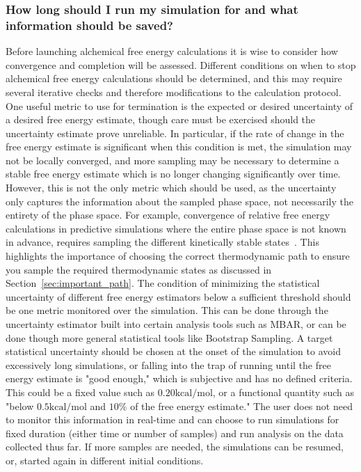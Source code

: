 \documentclass[9pt,bestpractices]{livecoms}
\begin{document}
\subsubsection{How long should I run my simulation for and what information should be saved?}
Before launching alchemical free energy calculations it is wise to consider how convergence and completion will be assessed. Different conditions on when to stop alchemical free energy calculations should be determined, and this may require several iterative checks and therefore modifications to the calculation protocol.
One useful metric to use for termination is the expected or desired uncertainty of a desired free energy estimate, though care must be exercised should the uncertainty estimate prove unreliable.
In particular, if the rate of change in the free energy estimate is significant when this condition is met, the simulation may not be locally converged, and more sampling may be necessary to determine a stable free energy estimate which is no longer changing significantly over time. 
However, this is not the only metric which should be used, as the uncertainty only captures the information about the sampled phase space, not necessarily the entirety of the phase space.  
For example, 
convergence of relative free energy calculations in predictive simulations where the entire phase space is not known in advance, requires sampling the different kinetically stable states~\cite{mobley2012perspective}.  
This highlights the importance of choosing the correct thermodynamic path to ensure you sample the required thermodynamic states as discussed in Section~\ref{sec:important_path}.
%
The condition of minimizing the statistical uncertainty of different free energy estimators below a sufficient threshold should be one metric monitored over the simulation. This can be done through the uncertainty estimator built into certain analysis tools such as MBAR, or can be done though more general statistical tools like Bootstrap Sampling. 
A target statistical uncertainty should be chosen at the onset of the simulation to avoid excessively long simulations, or falling into the trap of running until the free energy estimate is "good enough," which is subjective and has no defined criteria. This could be a fixed value such as $0.20 \mathrm{kcal/mol}$, or a functional quantity such as "below $0.5 \mathrm{kcal/mol}$ and $10\%$ of the free energy estimate." The user does not need to monitor this information in real-time and can choose to run simulations for fixed duration (either time or number of samples) and run analysis on the data collected thus far. If more samples are needed, the simulations can be resumed, or, started again in different initial conditions. 
\end{document}
